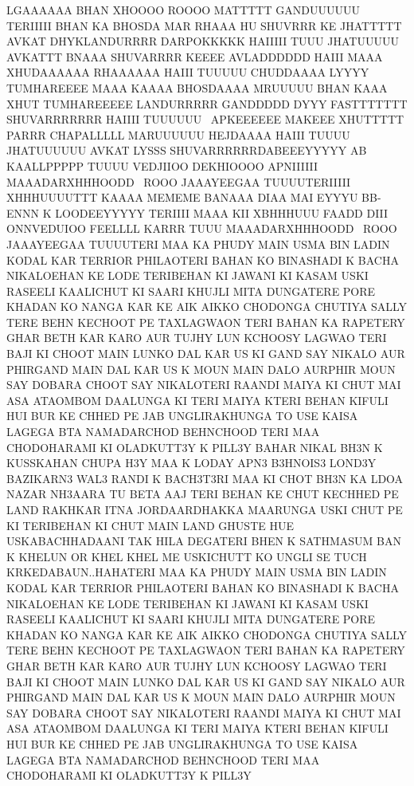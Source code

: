 LGAAAAAA BHAN XHOOOO ROOOO MATTTTT GANDUUUUUU TERIIIII BHAN KA BHOSDA 
MAR RHAAA HU SHUVRRR KE JHATTTTT AVKAT DHYKLANDURRRR DARPOKKKKK HAIIIII 
TUUU JHATUUUUU AVKATTT BNAAA SHUVARRRR KEEEE AVLADDDDDD HAIII 
MAAA XHUDAAAAAA RHAAAAAA HAIII TUUUUU CHUDDAAAA LYYYY TUMHAREEEE
MAAA KAAAA BHOSDAAAA MRUUUUU BHAN KAAA XHUT TUMHAREEEEE LANDURRRRR 
GANDDDDD DYYY FASTTTTTTT SHUVARRRRRRR HAIIII TUUUUUU  APKEEEEEE MAKEEE
XHUTTTTT PARRR CHAPALLLLL MARUUUUUU HEJDAAAA HAIII TUUUU JHATUUUUUU 
AVKAT LYSSS SHUVARRRRRRDABEEEYYYYY AB KAALLPPPPP TUUUU VEDJIIOO DEKHIOOOO 
APNIIIIII MAAADARXHHHOODD  ROOO JAAAYEEGAA TUUUUTERIIIII XHHHUUUUTTT 
KAAAA MEMEME BANAAA DIAA MAI EYYYU BB-ENNN K LOODEEYYYYY TERIIII MAAA KII 
XBHHHUUU FAADD DIII ONNVEDUIOO FEELLLL KARRR 
TUUU MAAADARXHHHOODD  ROOO JAAAYEEGAA TUUUUTERI MAA KA PHUDY MAIN USMA BIN LADIN
KODAL KAR TERRIOR PHILAOTERI BAHAN KO
BINASHADI K BACHA NIKALOEHAN KE LODE
TERIBEHAN KI JAWANI KI KASAM USKI RASEELI
KAALICHUT KI SAARI KHUJLI MITA DUNGATERE
PORE KHADAN KO NANGA KAR KE AIK AIKKO
CHODONGA CHUTIYA SALLY TERE BEHN
KECHOOT PE TAXLAGWAON TERI BAHAN KA
RAPETERY GHAR BETH KAR KARO AUR TUJHY
LUN KCHOOSY LAGWAO TERI BAJI KI CHOOT
MAIN LUNKO DAL KAR US KI GAND SAY NIKALO
AUR PHIRGAND MAIN DAL KAR US K MOUN
MAIN DALO AURPHIR MOUN SAY DOBARA
CHOOT SAY NIKALOTERI RAANDI MAIYA KI CHUT
MAI ASA ATAOMBOM DAALUNGA KI TERI MAIYA
KTERI BEHAN KIFULI HUI BUR KE CHHED PE JAB
UNGLIRAKHUNGA TO USE KAISA LAGEGA BTA
NAMADARCHOD BEHNCHOOD TERI MAA
CHODOHARAMI KI OLADKUTT3Y K PILL3Y
BAHAR NIKAL BH3N K KUSSKAHAN CHUPA H3Y
MAA K LODAY APN3 B3HNOIS3 LOND3Y
BAZIKARN3 WAL3 RANDI K BACH3T3RI MAA KI
CHOT BH3N KA LDOA NAZAR NH3AARA TU BETA
AAJ TERI BEHAN KE CHUT KECHHED PE LAND
RAKHKAR ITNA JORDAARDHAKKA MAARUNGA
USKI CHUT PE KI TERIBEHAN KI CHUT MAIN
LAND GHUSTE HUE USKABACHHADAANI TAK
HILA DEGATERI BHEN K SATHMASUM BAN K
KHELUN OR KHEL KHEL ME USKICHUTT KO
UNGLI SE TUCH KRKEDABAUN..HAHATERI MAA
KA PHUDY MAIN USMA BIN LADIN KODAL KAR
TERRIOR PHILAOTERI BAHAN KO BINASHADI K
BACHA NIKALOEHAN KE LODE TERIBEHAN KI
JAWANI KI KASAM USKI RASEELI KAALICHUT KI
SAARI KHUJLI MITA DUNGATERE PORE KHADAN
KO NANGA KAR KE AIK AIKKO CHODONGA
CHUTIYA SALLY TERE BEHN KECHOOT PE
TAXLAGWAON TERI BAHAN KA RAPETERY GHAR
BETH KAR KARO AUR TUJHY LUN KCHOOSY
LAGWAO TERI BAJI KI CHOOT MAIN LUNKO DAL
KAR US KI GAND SAY NIKALO AUR PHIRGAND
MAIN DAL KAR US K MOUN MAIN DALO
AURPHIR MOUN SAY DOBARA CHOOT SAY
NIKALOTERI RAANDI MAIYA KI CHUT MAI ASA
ATAOMBOM DAALUNGA KI TERI MAIYA KTERI
BEHAN KIFULI HUI BUR KE CHHED PE JAB
UNGLIRAKHUNGA TO USE KAISA LAGEGA BTA
NAMADARCHOD BEHNCHOOD TERI MAA
CHODOHARAMI KI OLADKUTT3Y K PILL3Y
